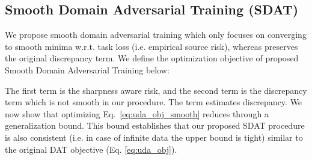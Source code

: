 \documentclass[table,dvipsnames]{article}
\theoremstyle{plain}
\theoremstyle{definition}
\theoremstyle{remark}
\begin{document}
\subsection{Smooth Domain Adversarial Training (SDAT)}
We propose smooth domain adversarial training which only focuses on converging to smooth minima w.r.t. {task} loss (i.e. empirical source risk), whereas preserves the original discrepancy term. We define the optimization objective of proposed Smooth Domain Adversarial Training below:

\vspace{-2em}

The first term is the sharpness aware risk, and the second term is the discrepancy term which is not smooth in our procedure. The term  estimates  discrepancy. We now show that optimizing Eq.\ \ref{eq:uda_obj_smooth} reduces  through a generalization bound. {This bound establishes that our proposed SDAT procedure is also consistent (i.e. in case of infinite data the upper bound is tight) similar to the original DAT objective (Eq. \ref{eq:uda_obj})}.  
\end{document}
